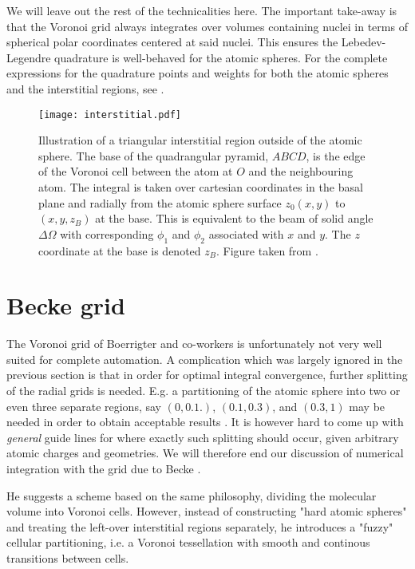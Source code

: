 \documentclass[../../master.tex]{subfiles}
\begin{document}
We will leave out the rest of the technicalities here. The important take-away is that the Voronoi grid always integrates over volumes containing nuclei in terms of spherical polar coordinates centered at said nuclei. This ensures the Lebedev-Legendre quadrature is well-behaved for the atomic spheres. For the complete expressions for the quadrature points and weights for both the atomic spheres and the interstitial regions, see \cite{voronoi2}.

\begin{SCfigure}
\centering
\texttt{[image: interstitial.pdf]}
\caption{Illustration of a triangular interstitial region outside of the atomic sphere. The base of the quadrangular pyramid, $ABCD$, is the edge of the Voronoi cell between the atom at $O$ and the neighbouring atom. The integral is taken over cartesian coordinates in the basal plane and radially from the atomic sphere surface $z_0(x,y)$ to $(x,y,z_B)$ at the base. This is equivalent to the beam of solid angle $\Delta \Omega$ with corresponding $\phi_1$ and $\phi_2$ associated with $x$ and $y$. The $z$ coordinate at the base is denoted $z_B$.  Figure taken from \cite{voronoi2}.\label{fig:dft4}}
\end{SCfigure}

\section{Becke grid}
The Voronoi grid of Boerrigter and co-workers is unfortunately not very well suited for complete automation. A complication which was largely ignored in the previous section is that in order for optimal integral convergence, further splitting of the radial grids is needed. E.g. a partitioning of the atomic sphere into two or even three separate regions, say $(0,0.1.)$, $(0.1,0.3)$, and $(0.3,1)$ may be needed in order to obtain acceptable results \cite{voronoi1}. It is however hard to come up with \emph{general} guide lines for where exactly such splitting should occur, given arbitrary atomic charges and geometries. We will therefore end our discussion of numerical integration with the grid due to Becke \cite{beckegrid}.

He suggests a scheme based on the same philosophy, dividing the molecular volume into Voronoi cells. However, instead of constructing "hard atomic spheres" and treating the left-over interstitial regions separately, he introduces a "fuzzy" cellular partitioning, i.e. a Voronoi tessellation with smooth and continous transitions between cells. 
\end{document}
